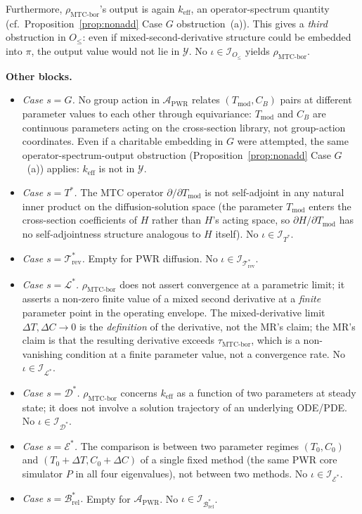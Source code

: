 \documentclass[acmsmall, screen]{acmart}
\begin{document}
Furthermore, $\rho_{\mathrm{MTC\text{-}bor}}$'s output is again $k_{\mathrm{eff}}$, an operator-spectrum quantity (cf.\ Proposition~\ref{prop:nonadd} Case $G$ obstruction~(a)). This gives a \emph{third} obstruction in $O_{\le}$: even if mixed-second-derivative structure could be embedded into $\pi$, the output value would not lie in $\mathcal{Y}$. No $\iota \in \mathcal{I}_{O_{\le}}$ yields $\rho_{\mathrm{MTC\text{-}bor}}$.

\textbf{Other blocks.}
\begin{itemize}[leftmargin=*,nosep]
  \item \emph{Case $s = G$.} No group action in $\mathcal{A}_{\mathrm{PWR}}$ relates $(T_{\mathrm{mod}}, C_{B})$ pairs at different parameter values to each other through equivariance: $T_{\mathrm{mod}}$ and $C_{B}$ are continuous parameters acting on the cross-section library, not group-action coordinates. Even if a charitable embedding in $G$ were attempted, the same operator-spectrum-output obstruction (Proposition~\ref{prop:nonadd} Case $G$~(a)) applies: $k_{\mathrm{eff}}$ is not in $\mathcal{Y}$.
  \item \emph{Case $s = T^{*}$.} The MTC operator $\partial/\partial T_{\mathrm{mod}}$ is not self-adjoint in any natural inner product on the diffusion-solution space (the parameter $T_{\mathrm{mod}}$ enters the cross-section coefficients of $H$ rather than $H$'s acting space, so $\partial H/\partial T_{\mathrm{mod}}$ has no self-adjointness structure analogous to $H$ itself). No $\iota \in \mathcal{I}_{T^{*}}$.
  \item \emph{Case $s = \mathcal{T}_{\mathrm{rev}}^{*}$.} Empty for PWR diffusion. No $\iota \in \mathcal{I}_{\mathcal{T}_{\mathrm{rev}}^{*}}$.
  \item \emph{Case $s = \mathcal{L}^{*}$.} $\rho_{\mathrm{MTC\text{-}bor}}$ does not assert convergence at a parametric limit; it asserts a non-zero finite value of a mixed second derivative at a \emph{finite} parameter point in the operating envelope. The mixed-derivative limit $\Delta T, \Delta C \to 0$ is the \emph{definition} of the derivative, not the MR's claim; the MR's claim is that the resulting derivative exceeds $\tau_{\mathrm{MTC\text{-}bor}}$, which is a non-vanishing condition at a finite parameter value, not a convergence rate. No $\iota \in \mathcal{I}_{\mathcal{L}^{*}}$.
  \item \emph{Case $s = \mathcal{D}^{*}$.} $\rho_{\mathrm{MTC\text{-}bor}}$ concerns $k_{\mathrm{eff}}$ as a function of two parameters at steady state; it does not involve a solution trajectory of an underlying ODE/PDE. No $\iota \in \mathcal{I}_{\mathcal{D}^{*}}$.
  \item \emph{Case $s = \mathcal{E}^{*}$.} The comparison is between two parameter regimes $(T_{0}, C_{0})$ and $(T_{0}+\Delta T, C_{0}+\Delta C)$ of a single fixed method (the same PWR core simulator $P$ in all four eigenvalues), not between two methods. No $\iota \in \mathcal{I}_{\mathcal{E}^{*}}$.
  \item \emph{Case $s = \mathcal{B}_{\mathrm{rel}}^{*}$.} Empty for $\mathcal{A}_{\mathrm{PWR}}$. No $\iota \in \mathcal{I}_{\mathcal{B}_{\mathrm{rel}}^{*}}$.
\end{itemize}
\end{document}
